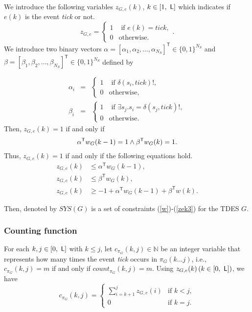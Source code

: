 \documentclass[journal,twoside,web]{IEEEtran}
\newcommand{\Len}{{\sf L}}
\begin{document}
We introduce the following variables $z_{G,e}(k)$, $k\in[1,\ \Len]$ which indicates if $e(k)$ is the event \textit{tick} or not.
\[
z_{G,e}=\left\{ \begin{array}{ll}
1 & \mbox{ if } e(k)=tick, \\
0 & \mbox{otherwise.}
\end{array} \right. .
\]
We introduce two binary vectors $\alpha=[\alpha_1, \alpha_2,\ldots , \alpha_{N_S}]^{\mathsf{T}} \in \{0, 1\}^{{N_S}}$ and  $\beta=[\beta_1, \beta_2,\ldots , \beta_{N_S}]^{\mathsf{T}} \in \{0, 1\}^{{N_S}}$ defined by

\begin{eqnarray*}
\alpha_{i}&=&\left\{ \begin{array}{ll}
1 & \mbox{ if } \delta(s_i, tick)!, \\
0 & \mbox{otherwise,}
\end{array} \right.\\
\beta_{i}&=&\left\{ \begin{array}{ll}
1 & \mbox{ if } \exists s_j. s_i=\delta(s_j,tick)!, \\
0 & \mbox{otherwise.}
\end{array} \right.
\end{eqnarray*}
Then, $z_{G,e}(k)=1$ if and only if
\begin{align}%
\alpha^\mathsf{T} w_G (k-1) = 1 \wedge \beta^\mathsf{T} w_G (k) =1. \notag 
\end{align}
Thus, $z_{G,e}(k)=1$ if and only if the following equations hold.
\begin{align}
z_{G,e} (k) &\leq \alpha^\mathsf{T} w_G (k-1),\label{zek1} \\
z_{G,e} (k) &\leq \beta^\mathsf{T} w_G (k), \label{zek2}  \\
z_{G,e} (k) & \geq -1 + \alpha^\mathsf{T} w_G (k-1) + \beta^\mathsf{T} w (k).\label{zek3}
\end{align}

Then, denoted by $SYS(G)$ is a set of constraints (\ref{w})-(\ref{zek3}) for the TDES $G$.


\subsubsection{Counting function}
For each $k, j \in [0,\ \Len]$ with $k\leq j$, let $c_{\pi_G} (k, j) \in \mathbb{N}$ be an integer variable that represents how many times the event \textit{tick} occurs in $\pi_G(k...j)$, i.e., $c_{\pi_G}(k,j) = m$ if and only if $count_{\pi_G}(k,j) = m$. 
Using $z_{G,e} (k)\, (k \in [0,\ \Len])$, we have
\begin{equation}\label{ckj}
c_{\pi_G} (k, j) = \left\{ \begin{array}{ll}
\displaystyle{\sum^j _{i = k+1} z_{G,e} (i)} & \mbox{if } k<j , \\
0 & \mbox{if } k=j.
\end{array} \right. 
\end{equation}
\end{document}
